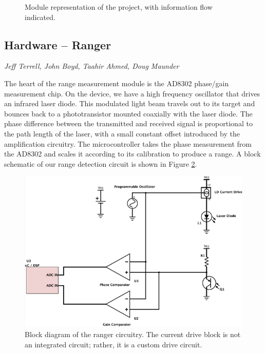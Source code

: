 \documentclass[twocolumn]{article}
\begin{document}
\begin{figure}[h]
  \centering
  \small
  
  \caption{Module representation of the project, with information flow
    indicated.}
  \label{fig:project-block-diagram}
\end{figure}

\subsection{Hardware -- Ranger}

\emph{Jeff Terrell, John Boyd, Taahir Ahmed, Doug Maunder}

The heart of the range measurement module is the AD8302 phase/gain measurement
chip.  On the device, we have a high frequency oscillator that drives an
infrared laser diode.  This modulated light beam travels out to its target and
bounces back to a phototransistor mounted coaxially with the laser diode.  The
phase difference between the transmitted and received signal is proportional to
the path length of the laser, with a small constant offset introduced by the
amplification circuitry.  The microcontroller takes the phase measurement from
the AD8302 and scales it according to its calibration to produce a range. A
block schematic of our range detection circuit is shown in Figure
\ref{fig:ranger-block}.

\begin{figure}[h]
  \centering
  \includegraphics[width=\columnwidth]{ranger-block}
  \caption{Block diagram of the ranger circuitry.  The current drive block is
    not an integrated circuit; rather, it is a custom drive circuit.}
  \label{fig:ranger-block}
\end{figure}
\end{document}
